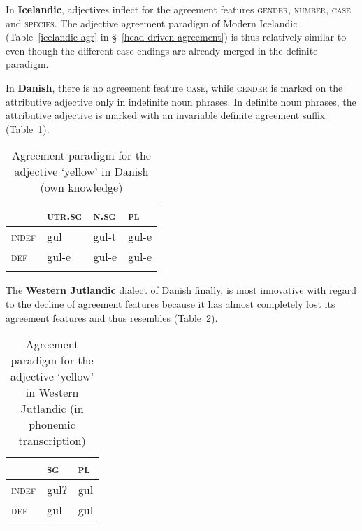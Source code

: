 In {\bf Icelandic}, adjectives inflect for the agreement features \textsc{gender}, \textsc{number}, \textsc{case} and \textsc{species}. The adjective agreement paradigm of Modern Icelandic (Table~\ref{icelandic agr} in \S~\ref{head-driven agreement}) is thus relatively similar to  even though the different case endings are already merged in the definite paradigm.

In {\bf Danish},\label{danish synchr} there is no agreement feature \textsc{case}, while \textsc{gender} is marked on the attributive adjective only in indefinite noun phrases. In definite noun phrases, the attributive adjective is marked with an invariable definite agreement suffix (Table~\ref{danish agr paradigm}).
\begin{table}
\begin{tabular}{l l l l}
\lsptoprule
		& \textsc{utr.sg}	&\textsc{n.sg}	&\textsc{pl}\\
\midrule
\textsc{indef}	&gul	 	&gul-t		&gul-e\\

\textsc{def}	&gul-e	&gul-e		&gul-e\\
\lspbottomrule
\end{tabular}
\caption[Adjective paradigm for Danish]{Agreement paradigm for the adjective ‘yellow’ in Danish (own knowledge)}
\label{danish agr paradigm}
\end{table}
The {\bf Western Jutlandic} dialect of Danish finally, is most innovative with regard to the decline of agreement features because it has almost completely lost its agreement features and thus resembles  (Table~\ref{jutl agr paradigm}).
\begin{table}
\begin{tabular}{l l l}
\lsptoprule		& \textsc{sg}	&\textsc{pl}\\
\midrule
\textsc{indef}	& gulʔ	 	&gul\\

\textsc{def}	&gul			&gul\\
\lspbottomrule
\end{tabular}
\caption[Adjective paradigm for W-Jutlandic]{Agreement paradigm for the adjective ‘yellow’ in Western Jutlandic (in phonemic transcription) \citep{ringgaard1960}}
\label{jutl agr paradigm}
\end{table}

